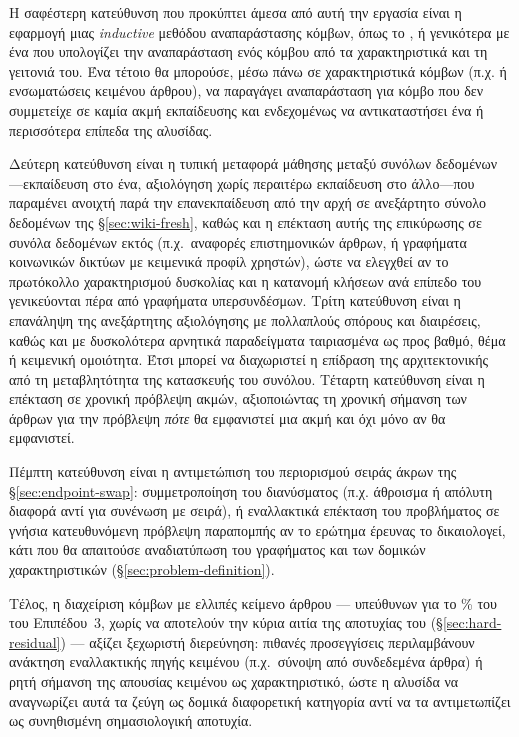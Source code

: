 Η σαφέστερη κατεύθυνση που προκύπτει άμεσα από αυτή την εργασία είναι η
εφαρμογή μιας \textit{inductive} μεθόδου αναπαράστασης κόμβων, όπως το , ή γενικότερα με ένα  που υπολογίζει την αναπαράσταση ενός κόμβου από τα χαρακτηριστικά και τη γειτονιά του.
Ένα τέτοιο  θα μπορούσε, μέσω  πάνω σε χαρακτηριστικά κόμβων (π.χ.  ή  ενσωματώσεις κειμένου άρθρου), να παραγάγει αναπαράσταση για κόμβο που δεν συμμετείχε σε καμία ακμή εκπαίδευσης και ενδεχομένως να αντικαταστήσει ένα ή περισσότερα επίπεδα της αλυσίδας.

Δεύτερη κατεύθυνση είναι η τυπική μεταφορά μάθησης μεταξύ συνόλων δεδομένων
---εκπαίδευση στο ένα, αξιολόγηση χωρίς περαιτέρω εκπαίδευση στο
άλλο---που παραμένει ανοιχτή παρά την επανεκπαίδευση από την αρχή σε
ανεξάρτητο σύνολο δεδομένων  της \S\ref{sec:wiki-fresh}, καθώς
και η επέκταση αυτής της επικύρωσης σε συνόλα δεδομένων εκτός 
(π.χ.\ αναφορές επιστημονικών άρθρων, ή γραφήματα κοινωνικών δικτύων με
κειμενικά προφίλ χρηστών), ώστε να ελεγχθεί αν το πρωτόκολλο χαρακτηρισμού
δυσκολίας και η κατανομή κλήσεων ανά επίπεδο του  γενικεύονται
πέρα από γραφήματα υπερσυνδέσμων.
Τρίτη κατεύθυνση είναι η επανάληψη της ανεξάρτητης αξιολόγησης με πολλαπλούς
σπόρους  και διαιρέσεις, καθώς και με δυσκολότερα αρνητικά παραδείγματα
ταιριασμένα ως προς βαθμό, θέμα ή κειμενική ομοιότητα.
Έτσι μπορεί να διαχωριστεί
η επίδραση της αρχιτεκτονικής από τη μεταβλητότητα της κατασκευής του συνόλου.
Τέταρτη κατεύθυνση είναι η επέκταση σε χρονική πρόβλεψη ακμών, αξιοποιώντας τη χρονική
σήμανση των άρθρων  για την πρόβλεψη \textit{πότε} θα εμφανιστεί μια
ακμή και όχι μόνο αν θα εμφανιστεί.

Πέμπτη κατεύθυνση είναι η αντιμετώπιση του περιορισμού σειράς άκρων της
\S\ref{sec:endpoint-swap}: συμμετροποίηση του διανύσματος  (π.χ.
άθροισμα ή απόλυτη διαφορά αντί για συνένωση με σειρά), ή εναλλακτικά επέκταση
του προβλήματος σε γνήσια κατευθυνόμενη πρόβλεψη παραπομπής αν το ερώτημα
έρευνας το δικαιολογεί, κάτι που θα απαιτούσε αναδιατύπωση του γραφήματος και
των δομικών χαρακτηριστικών (\S\ref{sec:problem-definition}).

Τέλος, η διαχείριση κόμβων με ελλιπές κείμενο άρθρου --- υπεύθυνων για το \HardResMissingPct\% του
 του Επιπέδου~3, χωρίς να αποτελούν την κύρια αιτία της
αποτυχίας του (\S\ref{sec:hard-residual}) --- αξίζει ξεχωριστή διερεύνηση: πιθανές
προσεγγίσεις περιλαμβάνουν ανάκτηση εναλλακτικής πηγής κειμένου (π.χ.\ σύνοψη από
συνδεδεμένα άρθρα) ή ρητή σήμανση της απουσίας κειμένου ως χαρακτηριστικό, ώστε η
αλυσίδα να αναγνωρίζει αυτά τα ζεύγη ως δομικά διαφορετική κατηγορία αντί να τα
αντιμετωπίζει ως συνηθισμένη σημασιολογική αποτυχία.
